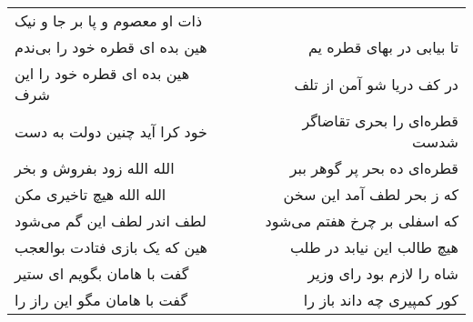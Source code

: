 \begin{center}
\begin{longtable}{l p{0.5cm} r}
ذات او معصوم و پا بر جا و نیک
\\
هین بده ای قطره خود را بی‌ندم
&&
تا بیابی در بهای قطره یم
\\
هین بده ای قطره خود را این شرف
&&
در کف دریا شو آمن از تلف
\\
خود کرا آید چنین دولت به دست
&&
قطره‌ای را بحری تقاضاگر شدست
\\
الله الله زود بفروش و بخر
&&
قطره‌ای ده بحر پر گوهر ببر
\\
الله الله هیچ تاخیری مکن
&&
که ز بحر لطف آمد این سخن
\\
لطف اندر لطف این گم می‌شود
&&
که اسفلی بر چرخ هفتم می‌شود
\\
هین که یک بازی فتادت بوالعجب
&&
هیچ طالب این نیابد در طلب
\\
گفت با هامان بگویم ای ستیر
&&
شاه را لازم بود رای وزیر
\\
گفت با هامان مگو این راز را
&&
کور کمپیری چه داند باز را
\\
\end{longtable}
\end{center}
